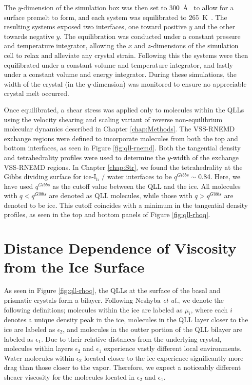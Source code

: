 The $y$-dimension of the simulation box was then set to 300~\AA~ to allow for a surface premelt to form, and each system was equilibrated to 265~K~. The resulting systems exposed two interfaces, one toward positive $y$ and the other towards negative $y$. The equilibration was conducted under a constant pressure and temperature integrator, allowing the $x$ and $z$-dimensions of the simulation cell to relax and alleviate any crystal strain. Following this the systems were then equilibrated under a constant volume and temperature integrator, and lastly under a constant volume and energy integrator. During these simulations, the width of the crystal (in the $y$-dimension) was monitored to ensure no appreciable crystal melt occurred.

Once equilibrated, a shear stress was applied only to molecules within the QLLs using the velocity shearing and scaling variant of reverse non-equilibrium molecular dynamics described in Chapter \ref{chap:Methods}.\cite{Kuang13} The VSS-RNEMD exchange regions were defined to incorporate molecules from both the top and bottom interfaces, as seen in Figure \ref{fig:qll-rnemd}. Both the tangential density and tetrahedrality profiles were used to determine the $y$-width of the exchange VSS-RNEMD regions. In Chapter \ref{chap:Str}, we found the tetrahedrality at the Gibbs dividing surface for ice-I$_\mathrm{h}$ / water interfaces to be $q^{Gibbs} \sim$0.84. Here, we have used $q^{Gibbs}$ as the cutoff value between the QLL and the ice. All molecules with $q < q^{Gibbs}$ are denoted as QLL molecules, while those with $q > q^{Gibbs}$ are denoted to be ice. This cutoff coincides with a minimum in the tangential density profiles, as seen in the top and bottom panels of Figure \ref{fig:qll-rhoq}.


\section{Distance Dependence of Viscosity from the Ice Surface}
As seen in Figure \ref{fig:qll-rhoq}, the QLLs at the surface of the
basal and prismatic crystals form a bilayer. Following Neshyba
\textit{et al.}, we denote the following definitions; molecules within
the ice are labeled as $\mu_{i}$, where each $i$ denotes a unique
density peak in the ice, molecules in the QLL layer closer to the ice
are labeled as $\epsilon_{2}$, and molecules in the outter portion of
the QLL bilayer are labeled as $\epsilon_{1}$.\cite{Neshyba2009} Due
to their relative distances from the underlying crystal, molecules
within layers $\epsilon_{2}$ and $\epsilon_{1}$ experience vastly
different local environments. Water molecules within $\epsilon_{2}$
located closer to the ice experience significantly more drag than
those closer to the vapor. Therefore, we expect a noticeably different
sheaer viscosity for the molecules located in $\epsilon_{2}$ and
$\epsilon_{1}$. 

